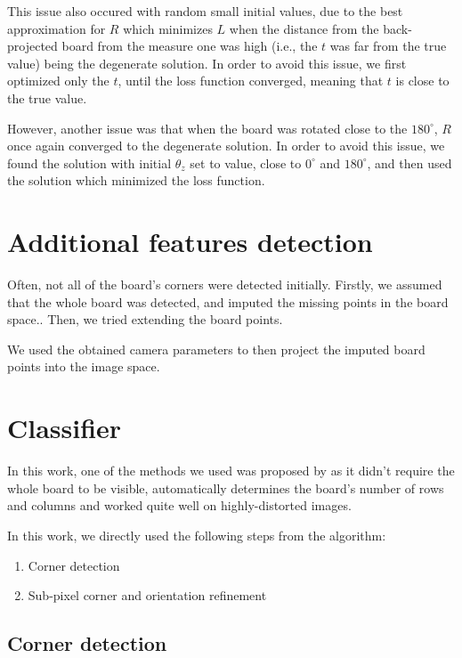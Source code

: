 This issue also occured with random small initial values, due to the best
approximation for \(R\) which minimizes \(L\) when the distance from the
back-projected board from the measure one was high (i.e., the \(t\) was far from
the true value) being the degenerate solution. In order to avoid this issue, we first optimized only the \(t\),
until the loss function converged, meaning that \(t\) is close to the true
value.

However, another issue was that when the board was rotated close to the
\(180^{\circ}\), \(R\) once again converged to the degenerate solution. In order
to avoid this issue, we found the solution with initial \(\theta_z\) set to
value, close to \(0^{\circ}\) and \(180^{\circ}\), and then used the solution
which minimized the loss function.

\section{Additional features detection}\label{sec:additional_features_detection}

Often, not all of the board's corners were detected initially. Firstly, we
assumed that the whole board was detected, and imputed the missing points in the
board space.. Then, we tried extending the board
points.

We used the obtained camera parameters to then project the imputed board points
into the image space.

\section{Classifier}\label{sec:classifier}

In this work, one of the methods we used was proposed by
\cite{geigerAutomaticCameraRange2012} as it didn't require the whole board to be
visible, automatically determines the board's number of rows and columns and
worked quite well on highly-distorted images.

In this work, we directly used the following steps from the algorithm:
\begin{enumerate}
	\item Corner detection
	\item Sub-pixel corner and orientation refinement
\end{enumerate}

\subsection{Corner detection}\label{sub:corner_detection}

